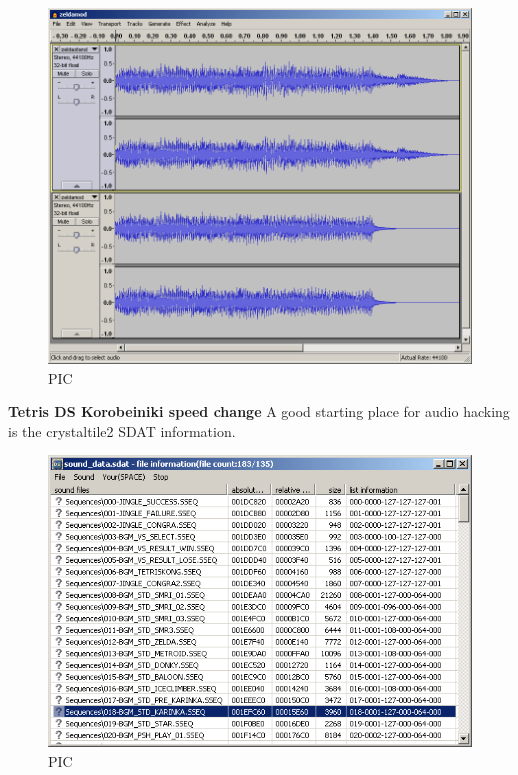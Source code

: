 \documentclass[
]{book}
\begin{document}
\begin{figure}
\centering
\includegraphics{images/156_home_fast6191_romhackingguide_unrenamed_fil___original_borders_romhackguideSDATSSEQedit_4.png}
\caption{PIC}
\end{figure}

\textbf{Tetris DS Korobeiniki speed change} A good starting place for audio hacking is the crystaltile2 SDAT information.

\begin{figure}
\centering
\includegraphics{images/157_home_fast6191_romhackingguide_unrenamed_fil____original_borders_romhackguideSDATlooping_1.png}
\caption{PIC}
\end{figure}
\end{document}

